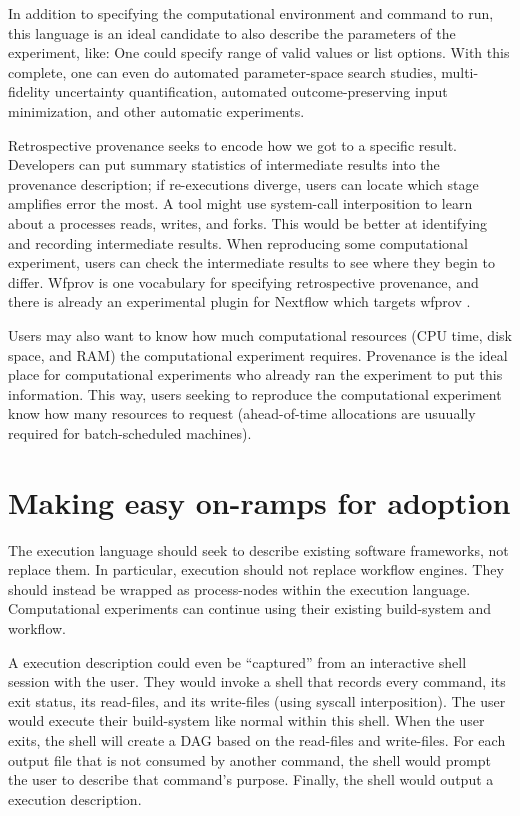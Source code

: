 \documentclass[manuscript,authordraft]{acmart}
\begin{document}
In addition to specifying the computational environment and command to
run, this language is an ideal candidate to also describe the parameters
of the experiment, like: One could specify range of valid values or list
options. With this complete, one can even do automated parameter-space
search studies, multi-fidelity uncertainty quantification, automated
outcome-preserving input minimization, and other automatic experiments.

Retrospective provenance seeks to encode how we got to a specific
result. Developers can put summary statistics of intermediate results
into the provenance description; if re-executions diverge, users can
locate which stage amplifies error the most. A tool might use
system-call interposition to learn about a processes reads, writes, and
forks. This would be better at identifying and recording intermediate
results. When reproducing some computational experiment, users can check
the intermediate results to see where they begin to differ. Wfprov is
one vocabulary for specifying retrospective provenance, and there is
already an experimental plugin for Nextflow which targets wfprov
\cite{grande_nf-prov_2023}.

Users may also want to know how much computational resources (CPU time,
disk space, and RAM) the computational experiment requires. Provenance
is the ideal place for computational experiments who already ran the
experiment to put this information. This way, users seeking to reproduce
the computational experiment know how many resources to request
(ahead-of-time allocations are usuually required for batch-scheduled
machines).

\hypertarget{making-easy-on-ramps-for-adoption}{%
\section{Making easy on-ramps for
adoption}\label{making-easy-on-ramps-for-adoption}}

The execution language should seek to describe existing software
frameworks, not replace them. In particular, execution should not
replace workflow engines. They should instead be wrapped as
process-nodes within the execution language. Computational experiments
can continue using their existing build-system and workflow.

A execution description could even be ``captured'' from an interactive
shell session with the user. They would invoke a shell that records
every command, its exit status, its read-files, and its write-files
(using syscall interposition). The user would execute their build-system
like normal within this shell. When the user exits, the shell will
create a DAG based on the read-files and write-files. For each output
file that is not consumed by another command, the shell would prompt the
user to describe that command's purpose. Finally, the shell would output
a execution description.
\end{document}
